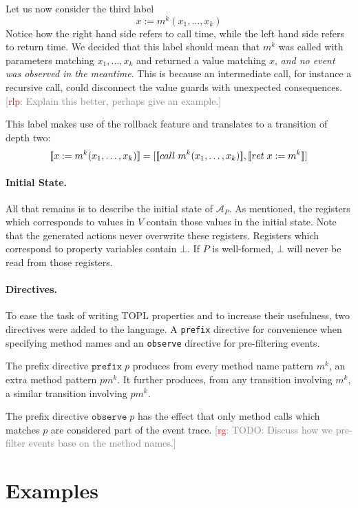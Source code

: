 \documentclass[9pt, preprint]{sigplanconf} %
\newcommand{\noterg}[2]{\textcolor{gray}{[\textcolor{red}{#1}: #2]}}
\newcommand{\rg}[1]{\noterg{rg}{#1}}
\newcommand{\rlp}[1]{\noterg{rlp}{#1}}
\newcommand{\A}{\ensuremath{\mathcal{A}}}
\theoremstyle{definition}
\theoremstyle{remark}
\begin{document}
Let us now consider the third label
\[
x := m^k(x_1, \ldots, x_k)
\]
Notice how the right hand side refers to call time, while the left
hand side refers to return time. We decided that this label should
mean that $m^k$ was called with parameters matching $x_1, \ldots, x_k$
and returned a value matching $x$, \emph{and no event was observed in
  the meantime}. This is because an intermediate call, for instance a
recursive call, could disconnect the value guards with unexpected
consequences. \rlp{Explain this better, perhaps give an example.}

This label makes use of the rollback feature and translates to a
transition of depth two:
\[
[\![x := m^k(x_1, \ldots, x_k)]\!]
=
[[\![call\;m^k(x_1, \ldots, x_k)]\!], [\![ret\;x := m^k]\!]]
\]

\paragraph{Initial State.}
All that remains is to describe the initial state of $\A_P$.
As mentioned, the registers which corresponds to values in $V$
contain those values in the initial state. Note that the generated
actions never overwrite these registers. Registers which correspond
to property variables contain $\bot$. If $P$ is well-formed, $\bot$
will never be read from those registers.

\paragraph{Directives.}
To ease the task of writing TOPL properties and to increase their
usefulness, two directives were added to the language. A \texttt{prefix}
directive for convenience when specifying method names and an
\texttt{observe} directive for pre-filtering events.

The prefix directive $\mathtt{prefix}\; p$ produces from every
method name pattern $m^k$, an extra method pattern $pm^k$. It further
produces, from any transition involving $m^k$, a similar transition
involving $pm^k$.

The prefix directive $\mathtt{observe}\; p$ has the effect that only
method calls which matches $p$ are considered part of the event trace.
\rg{TODO: Discuss how we pre-filter events base on the method names.}


\section{Examples} \label{sec:examples} %
\end{document}
